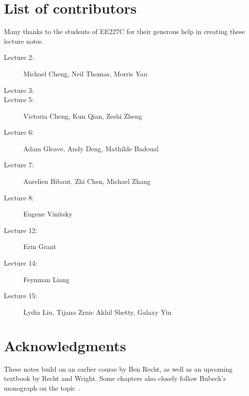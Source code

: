 \section{List of contributors}

Many thanks to the students of EE227C for their generous help in creating these
lecture notes.

\begin{description}
\item[Lecture 2:] Michael Cheng, Neil Thomas, Morris Yau
\item[Lecture 3:]
\item[Lecture 5:] Victoria Cheng, Kun Qian, Zeshi Zheng
\item[Lecture 6:] Adam Gleave, Andy Deng, Mathilde Badoual
\item[Lecture 7:] Aurelien Bibaut, Zhi Chen, Michael Zhang
\item[Lecture 8:] Eugene Vinitsky
\item[Lecture 12:] Erin Grant
\item[Lecture 14:] Feynman Liang
\item[Lecture 15:] Lydia Liu, Tijana Zrnic
\ite[Lecture 16:] Akhil Shetty, Galaxy Yin
\end{description}

\section{Acknowledgments}

These notes build on an earlier course by Ben Recht, as well as an upcoming
textbook by Recht and Wright. Some chapters also closely follow Bubeck's
monograph on the topic~\cite{Bubeck}.